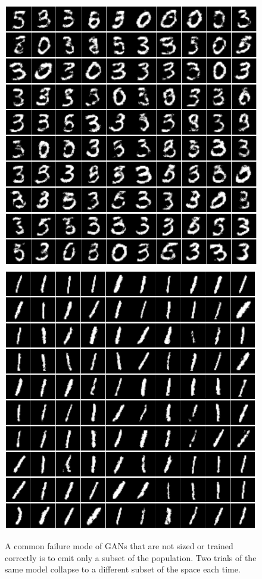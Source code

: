 \documentclass{article}
\begin{document}
\begin{figure}[h]
\caption{A common failure mode of GANs that are not sized or trained correctly is to emit only a subset of the population. Two trials of the same model collapse to a different subset of the space each time. }
\label{fig:failures}
\includegraphics[scale=0.3]{images/failure1.png}
\includegraphics[scale=0.3]{images/failure2.png}
\centering
\end{figure}
\end{document}
